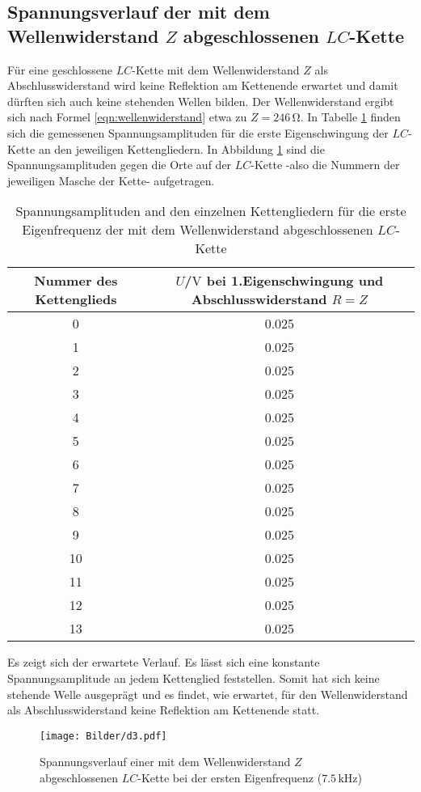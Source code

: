 \subsection{Spannungsverlauf der mit dem Wellenwiderstand $Z$ abgeschlossenen $LC$-Kette}
Für eine geschlossene $LC$-Kette mit dem Wellenwiderstand $Z$ als Abschlusswiderstand wird keine Reflektion am Kettenende erwartet und damit dürften sich auch keine stehenden Wellen bilden.
Der Wellenwiderstand ergibt sich nach Formel \eqref{eqn:wellenwiderstand} etwa zu $Z=246 \,\si{\ohm}$.
In Tabelle \ref{tab:lame} finden sich die gemessenen Spannungsamplituden für die erste Eigenschwingung der $LC$-Kette an den jeweiligen Kettengliedern.
In Abbildung \ref{fig:really?!} sind die Spannungsamplituden gegen die Orte auf der $LC$-Kette -also die Nummern der jeweiligen Masche der Kette- aufgetragen.
\begin{table}
  \centering
\caption{Spannungsamplituden and den einzelnen Kettengliedern für die erste Eigenfrequenz der mit dem Wellenwiderstand abgeschlossenen $LC$-Kette}
\label{tab:lame}
\begin{tabular}{cc}
\toprule
Nummer des Kettenglieds & $U$/$\si{\volt}$ bei 1.Eigenschwingung und Abschlusswiderstand $R=Z$ \\
\midrule
0 & 0.025 \\
1 & 0.025 \\
2 & 0.025 \\
3 & 0.025 \\
4 & 0.025 \\
5 & 0.025 \\
6 & 0.025 \\
7 & 0.025 \\
8 & 0.025 \\
9 & 0.025 \\
10 & 0.025 \\
11 & 0.025 \\
12 & 0.025 \\
13 & 0.025 \\
\bottomrule
\end{tabular}
\end{table}

Es zeigt sich der erwartete Verlauf. Es lässt sich eine konstante Spannungsamplitude an jedem Kettenglied feststellen.
Somit hat sich keine stehende Welle ausgeprägt und es findet, wie erwartet, für den Wellenwiderstand als Abschlusswiderstand keine Reflektion am Kettenende statt.


\begin{figure}
  \centering
 \texttt{[image: Bilder/d3.pdf]}
  \caption{Spannungsverlauf einer mit dem Wellenwiderstand $Z$ abgeschlossenen $LC$-Kette bei der ersten Eigenfrequenz ($7.5 \,\si{\kilo\Hz}$)}
  \label{fig:really?!}
\end{figure}
